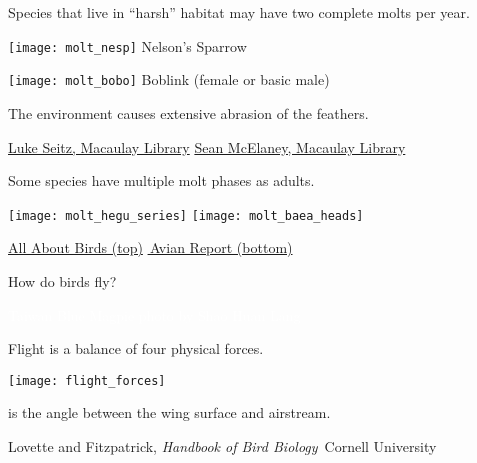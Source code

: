 \documentclass[t]{beamer}
\begin{document}
\begin{frame}{Species that live in “harsh” habitat may have two complete molts per year.}
	
	\vspace{-\baselineskip}
	\begin{multicols}{2}
		\texttt{[image: molt\_nesp]}\newline
		Nelson's Sparrow
		
		\columnbreak
		
		\texttt{[image: molt\_bobo]}\newline
		Boblink (female or basic male)
		
	\end{multicols}
	
	\bigskip
	
	The environment causes extensive abrasion of the feathers.
	
	\vfilll
	
	\tiny \href{https://macaulaylibrary.org/asset/40505401}{Luke Seitz, Macaulay Library} \hfill
	\href{https://macaulaylibrary.org/asset/271803811}{Sean McElaney, Macaulay Library}	
	
\end{frame}

\begin{frame}{Some species have multiple molt phases as adults.}
	\vspace{-0.75\baselineskip}
	\centering
	
	\texttt{[image: molt\_hegu\_series]} \newline
	\texttt{[image: molt\_baea\_heads]}
	
	\vfilll
	
	\tiny \href{https://www.allaboutbirds.org/news/the-basics-feather-molt/}{All About Birds (top)} \hfill \href{https://avianreport.com/age-and-identify-a-juvenile-and-sub-adult-bald-eagle/}{\textcopyright\,Avian Report (bottom)}
	
\end{frame}

{
\begin{frame}[t,plain]{How do birds fly?}

\vfilll

\tiny \hfill\textcolor{white}{Taiwan Blue Magpie photo by Shao Huan Lang}

\end{frame}
}
%
\begin{frame}[t,plain]{Flight is a balance of four physical forces.}
\centering

\texttt{[image: flight\_forces]}
\end{frame}
%
{
\begin{frame}[t,plain]{ is the angle between the wing surface and airstream.}

\vfilll

\tiny \hfill Lovette and Fitzpatrick, \textit{Handbook of Bird Biology} \textcopyright\,Cornell University

\end{frame}
}
\end{document}
